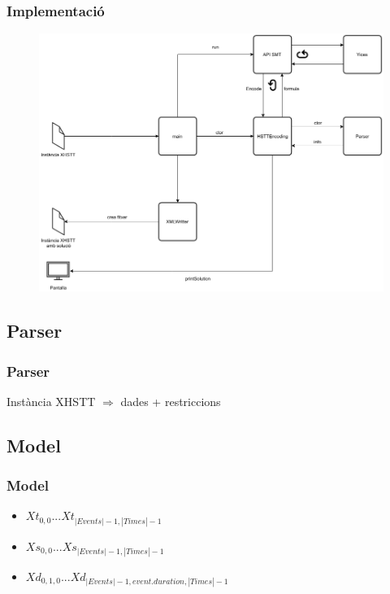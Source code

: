 \documentclass[11pt]{beamer}
\begin{document}
  \begin{frame}
  \frametitle{Implementació}
    \begin{figure}[p]
      \includegraphics[width=\textwidth]{Diagrames/Arqui2.png}
      \label{fig:procs}
    \end{figure}
  \end{frame}

  
  \subsection{Parser}
  
  \begin{frame}
    \frametitle{Parser}

    Instància XHSTT $\Rightarrow$ dades + restriccions


  \end{frame}

  \subsection{Model}
  
  \begin{frame}
    \frametitle{Model}

    \begin{itemize}
      \item $Xt_{0,0} . . . Xt_{|Events|-1,|Times|-1}$
      \item $Xs_{0,0} . . . Xs_{|Events|-1,|Times|-1}$
      \item $Xd_{0,1,0} . . . Xd_{|Events|-1, event.duration, |Times|-1}$
    \end{itemize}
  \end{frame}
\end{document}
